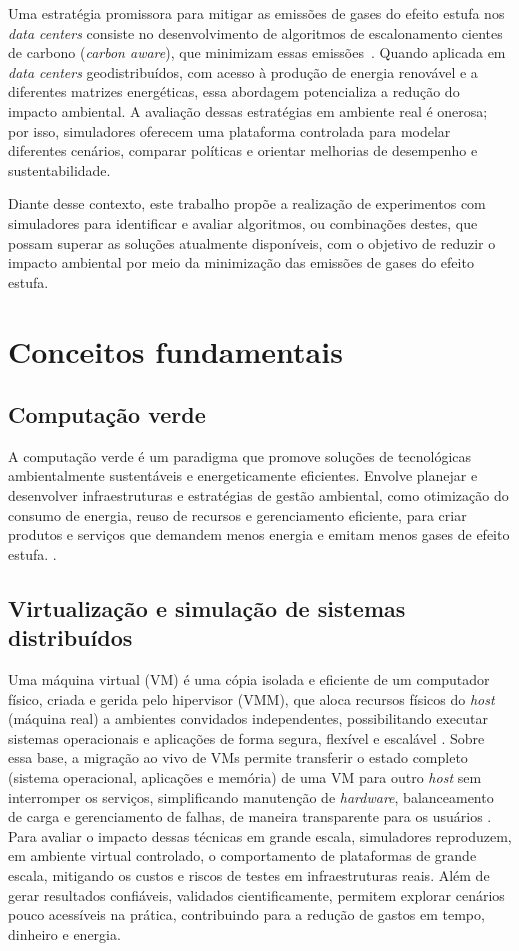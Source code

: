 \documentclass[12pt]{article}
\begin{document}
Uma estratégia promissora para mitigar as emissões de gases do efeito estufa nos \textit{data centers} consiste no desenvolvimento de algoritmos de escalonamento cientes de carbono (\textit{carbon aware}), que minimizam essas emissões~\cite{vasconcelos2023optimal}. Quando aplicada em \textit{data centers} geodistribuídos, com acesso à produção de energia renovável e a diferentes matrizes energéticas, essa abordagem potencializa a redução do impacto ambiental. A avaliação dessas estratégias em ambiente real é onerosa; por isso, simuladores oferecem uma plataforma controlada para modelar diferentes cenários, comparar políticas e orientar melhorias de desempenho e sustentabilidade.

Diante desse contexto, este trabalho propõe a realização de experimentos com simuladores para identificar e avaliar algoritmos, ou combinações destes, que possam superar as soluções atualmente disponíveis, com o objetivo de reduzir o impacto ambiental por meio da minimização das emissões de gases do efeito estufa.

\section{Conceitos fundamentais}
\subsection{Computação verde}
A computação verde é um paradigma que promove soluções de tecnológicas ambientalmente sustentáveis e energeticamente eficientes. Envolve planejar e desenvolver infraestruturas e estratégias de gestão ambiental, como otimização do consumo de energia, reuso de recursos e gerenciamento eficiente, para criar produtos e serviços que demandem menos energia e emitam menos gases de efeito estufa. \cite{paul:2018}.

\subsection{Virtualização e simulação de sistemas distribuídos}
Uma máquina virtual (VM) é uma cópia isolada e eficiente de um computador físico, criada e gerida pelo hipervisor (VMM), que aloca recursos físicos do \textit{host} (máquina real) a ambientes convidados independentes, possibilitando executar sistemas operacionais e aplicações de forma segura, flexível e escalável \cite{popek:74,buyya:13}. Sobre essa base, a migração ao vivo de VMs permite transferir o estado completo (sistema operacional, aplicações e memória) de uma VM para outro \textit{host} sem interromper os serviços, simplificando manutenção de \textit{hardware}, balanceamento de carga e gerenciamento de falhas, de maneira transparente para os usuários \cite{clark:2005}. Para avaliar o impacto dessas técnicas em grande escala, simuladores reproduzem, em ambiente virtual controlado, o comportamento de plataformas de grande escala, mitigando os custos e riscos de testes em infraestruturas reais. Além de gerar resultados confiáveis, validados cientificamente, permitem explorar cenários pouco acessíveis na prática, contribuindo para a redução de gastos em tempo, dinheiro e energia.
\end{document}
